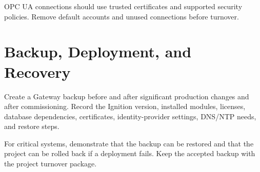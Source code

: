 OPC UA connections should use trusted certificates and supported security policies. Remove default accounts and unused connections before turnover.

\section{Backup, Deployment, and Recovery}
Create a Gateway backup before and after significant production changes and after commissioning. Record the Ignition version, installed modules, licenses, database dependencies, certificates, identity-provider settings, DNS/NTP needs, and restore steps.

For critical systems, demonstrate that the backup can be restored and that the project can be rolled back if a deployment fails. Keep the accepted backup with the project turnover package.
